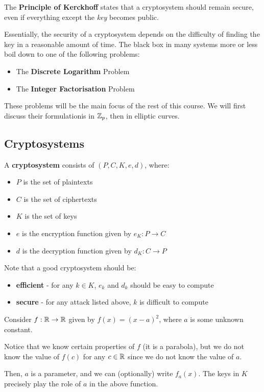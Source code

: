 \documentclass{article}
\begin{document}
\begin{defn}
The \textbf{Principle of Kerckhoff} states that a cryptosystem should remain secure, even if everything except the \textit{key} becomes public.
\end{defn}

Essentially, the security of a cryptosystem depends on the difficulty of finding the key
in a reasonable amount of time. The black box in many systems more or less boil down to
one of the following problems:
\begin{itemize}
    \item The \textbf{Discrete Logarithm} Problem
    \item The \textbf{Integer Factorisation} Problem
\end{itemize}

These problems will be the main focus of the rest of this course.
We will first discuss their formulationis in $ \mathbb{Z}_{p} $, then in elliptic curves.

\newpage
\subsection{Cryptosystems}
\begin{defn}
    A \textbf{cryptosystem} consists of $ (P, C, K, e, d) $, where:
    \begin{itemize}
        \item $ P $ is the set of plaintexts
        \item $ C $ is the set of ciphertexts
        \item $ K $ is the set of keys
        \item $ e $ is the encryption function given by $ e_{K} : P \rightarrow C $
        \item $ d $ is the decryption function given by $ d_{K} : C \rightarrow P $
    \end{itemize}
\end{defn}

Note that a good cryptosystem should be:
\begin{itemize}
    \item \textbf{efficient} - for any $ k \in K $, $ e_{k} $ and $ d_{k} $ should be easy to compute
    \item \textbf{secure} - for any attack listed above, $ k $ is difficult to compute
\end{itemize}

\begin{xmp}[source=Primary Source Material]
Consider $ f: \mathbb{R} \rightarrow \mathbb{R} $ given by $ f(x) = (x - a)^{2} $,
where $ a $ is some unknown constant.

Notice that we know certain properties of $ f $ (it is a parabola), but
we do not know the value of $ f(c) $ for any $ c \in \mathbb{R} $ since we do not know
the value of $ a $.

Then, $ a $ is a parameter, and we can (optionally) write $ f_{a}(x) $.
The keys in $ K $ precisely play the role of $ a $ in the above function.
\end{xmp}
\end{document}

